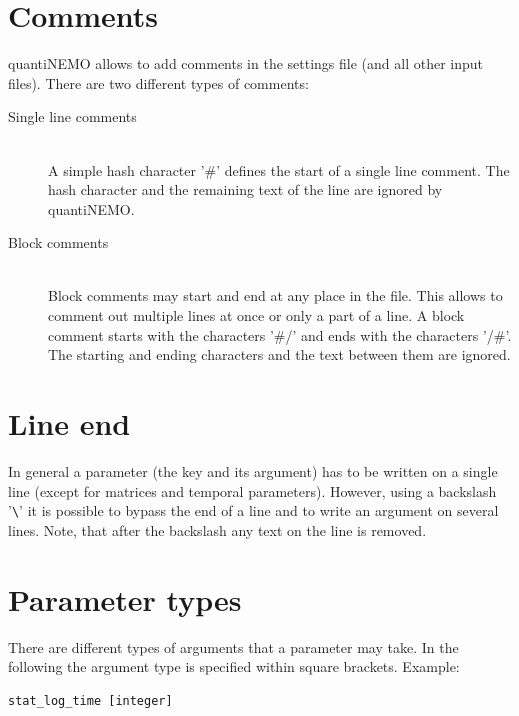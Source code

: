 \documentclass[letterpaper,12pt,oneside]{book}
\begin{document}
\section{Comments}
quantiNEMO allows to add comments in the settings file (and all other input files). There are two different types of comments:
\begin{description}
\item[Single line comments]\hspace*{\fill} \index{\#}\\
A simple hash character '\#' defines the start of a single line comment. The hash character and the remaining text of the line are ignored by quantiNEMO.

\item[Block comments]\hspace*{\fill} \\
Block comments may start and end at any place in the file. This allows to comment out multiple lines at once or only a part of a line. A block comment starts with the characters '\#/' and ends with the characters '/\#'. The starting and ending characters and the text between them are ignored.
\end{description}

\section{Line end}
In general a parameter (the key and its argument) has to be written on a single line (except for matrices and temporal parameters). However, using a backslash '\verb"\"' it is possible to bypass the end of a line and to write an argument on several lines. Note, that after the backslash any text on the line is removed. \index{\textbackslash}


\section{Parameter types}
There are different types of arguments that a parameter may take. In the following the argument type is specified within square brackets. Example:
\begin{lstlisting}[frame=single]
stat_log_time [integer]
\end{lstlisting}
\end{document}
